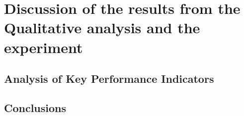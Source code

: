 \chapter{Discussion of the results from the Qualitative analysis and the experiment} \label{chap:chapter_5}

\section{Analysis of Key Performance Indicators} \label{sect:thefirst}

\section{Conclusions}

